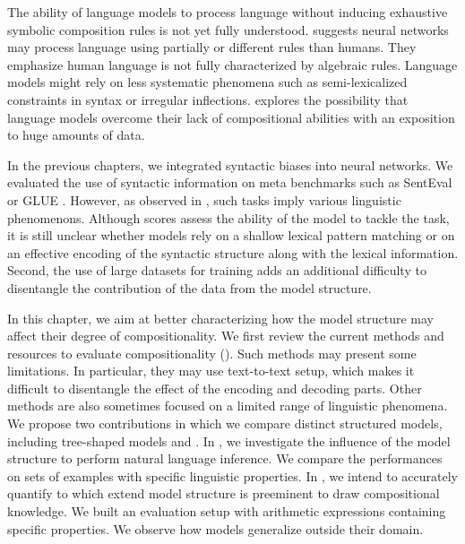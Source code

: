 The ability of language models to process language without inducing exhaustive symbolic composition rules is not yet fully understood. \textcite{baroni_19} suggests neural networks may process language using partially or different rules than humans. They emphasize human language is not fully characterized by algebraic rules. Language models might rely on less systematic phenomena such as semi-lexicalized constraints in syntax or irregular inflections.  explores the possibility that language models overcome their lack of compositional abilities with an exposition to huge amounts of data.

In the previous chapters, we integrated syntactic biases into neural networks. We evaluated the use of syntactic information on meta benchmarks such as SentEval \parencite{conneau_18} or GLUE \parencite{wang_19}. However, as observed in \textcite{baroni_18}, such tasks imply various linguistic phenomenons. Although scores assess the ability of the model to tackle the task, it is still unclear whether models rely on a shallow lexical pattern matching or on an effective encoding of the syntactic structure along with the lexical information. Second, the use of large datasets for training \parencite{bowman_15, williams_18} adds an additional difficulty to disentangle the contribution of the data from the model structure.

In this chapter, we aim at better characterizing how the model structure may affect their degree of compositionality. We first review the current methods and resources to evaluate compositionality (). Such methods may present some limitations. In particular, they may use text-to-text setup, which makes it difficult to disentangle the effect of the encoding and decoding parts. Other methods are also sometimes focused on a limited range of linguistic phenomena. We  propose two contributions in which we compare distinct structured models, including tree-shaped models and \bert. In , we investigate the influence of the model structure to perform natural language inference. We compare the performances on sets of examples with specific linguistic properties. In , we intend to accurately quantify to which extend model structure is preeminent to draw compositional knowledge. We built an evaluation setup with arithmetic expressions containing specific properties. We observe how models generalize outside their domain.

